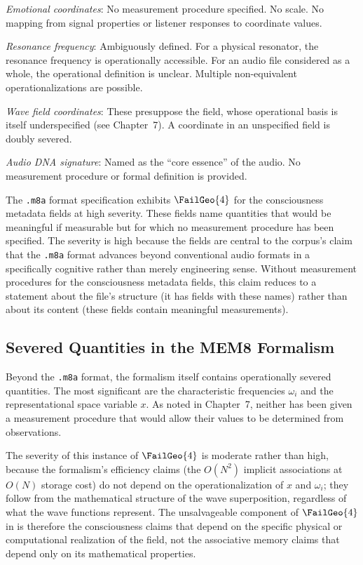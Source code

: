 \textit{Emotional coordinates}: No measurement procedure
specified. No scale. No mapping from signal properties
or listener responses to coordinate values.

\textit{Resonance frequency}: Ambiguously defined. For
a physical resonator, the resonance frequency is
operationally accessible. For an audio file considered
as a whole, the operational definition is unclear.
Multiple non-equivalent operationalizations are possible.

\textit{Wave field coordinates}: These presuppose the
\MEMeight{} field, whose operational basis is itself
underspecified (see Chapter~7). A coordinate in an
unspecified field is doubly severed.

\textit{Audio DNA signature}: Named as the ``core
essence'' of the audio. No measurement procedure or
formal definition is provided.

\begin{auditprop}
\label{ap:fg4-m8a}
The \texttt{.m8a} format specification exhibits $\FailGeo{4}$
for the consciousness metadata fields at high severity.
These fields name quantities that would be meaningful
if measurable but for which no measurement procedure
has been specified. The severity is high because the
fields are central to the corpus's claim that the
\texttt{.m8a} format advances beyond conventional audio
formats in a specifically cognitive rather than merely
engineering sense. Without measurement procedures for
the consciousness metadata fields, this claim reduces
to a statement about the file's structure (it has fields
with these names) rather than about its content (these
fields contain meaningful measurements).
\end{auditprop}

\subsection{Severed Quantities in the MEM\textbar{}8 Formalism}

Beyond the \texttt{.m8a} format, the \MEMeight{} formalism
itself contains operationally severed quantities. The
most significant are the characteristic frequencies
$\omega_i$ and the representational space variable $x$.
As noted in Chapter~7, neither has been given a
measurement procedure that would allow their values
to be determined from observations.

The severity of this instance of $\FailGeo{4}$ is
moderate rather than high, because the \MEMeight{}
formalism's efficiency claims (the $O(N^2)$ implicit
associations at $O(N)$ storage cost) do not depend
on the operationalization of $x$ and $\omega_i$;
they follow from the mathematical structure of the
wave superposition, regardless of what the wave
functions represent. The unsalvageable component
of $\FailGeo{4}$ in \MEMeight{} is therefore the
consciousness claims that depend on the specific
physical or computational realization of the field,
not the associative memory claims that depend only
on its mathematical properties.

